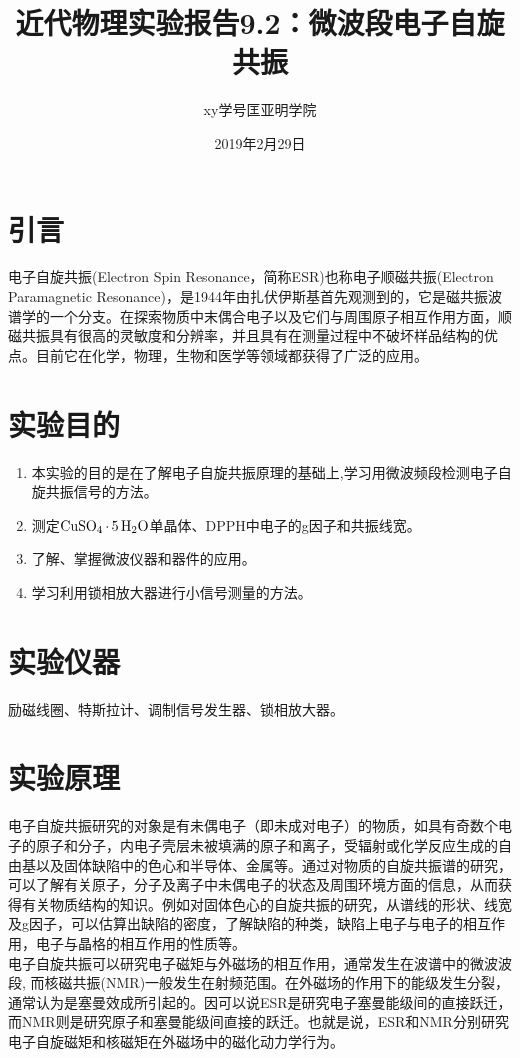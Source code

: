 \documentclass[a4paper]{article}
\title{近代物理实验报告9.2：微波段电子自旋共振}
\author{xy\quad 学号\quad 匡亚明学院}
\date{2019年2月29日}
\begin{document}
\maketitle


\section{引言}
电子自旋共振(Electron Spin Resonance，简称ESR)也称电子顺磁共振(Electron Paramagnetic Resonance)，是1944年由扎伏伊斯基首先观测到的，它是磁共振波谱学的一个分支。在探索物质中末偶合电子以及它们与周围原子相互作用方面，顺磁共振具有很高的灵敏度和分辨率，并且具有在测量过程中不破坏样品结构的优点。目前它在化学，物理，生物和医学等领域都获得了广泛的应用。

\section{实验目的}
\begin{enumerate}
\item 本实验的目的是在了解电子自旋共振原理的基础上,学习用微波频段检测电子自旋共振信号的方法。
\item 测定$\ce{CuSO_4 . 5H_2O}$单晶体、DPPH中电子的g因子和共振线宽。
\item 了解、掌握微波仪器和器件的应用。
\item 学习利用锁相放大器进行小信号测量的方法。
\end{enumerate}

\section{实验仪器}
励磁线圈、特斯拉计、调制信号发生器、锁相放大器。

\section{实验原理}
电子自旋共振研究的对象是有未偶电子（即未成对电子）的物质，如具有奇数个电子的原子和分子，内电子壳层未被填满的原子和离子，受辐射或化学反应生成的自由基以及固体缺陷中的色心和半导体、金属等。通过对物质的自旋共振谱的研究，可以了解有关原子，分子及离子中未偶电子的状态及周围环境方面的信息，从而获得有关物质结构的知识。例如对固体色心的自旋共振的研究，从谱线的形状、线宽及g因子，可以估算出缺陷的密度，了解缺陷的种类，缺陷上电子与电子的相互作用，电子与晶格的相互作用的性质等。\\
电子自旋共振可以研究电子磁矩与外磁场的相互作用，通常发生在波谱中的微波波段, 而核磁共振(NMR)一般发生在射频范围。在外磁场的作用下的能级发生分裂，通常认为是塞曼效成所引起的。因可以说ESR是研究电子塞曼能级间的直接跃迁，而NMR则是研究原子和塞曼能级间直接的跃迁。也就是说，ESR和NMR分别研究电子自旋磁矩和核磁矩在外磁场中的磁化动力学行为。
\end{document}
